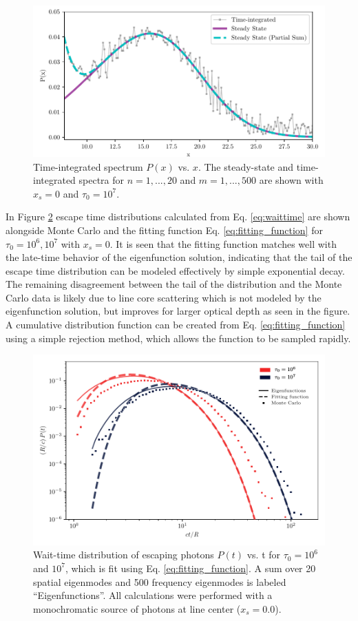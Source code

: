 \documentclass[linenumbers]{aastex63}
\begin{document}
\begin{figure}
    \centering
    \includegraphics{steadystate.pdf}
    \caption{Time-integrated spectrum $P(x)$ vs. $x$. The steady-state and time-integrated spectra for $n=1, ..., 20$ and $m=1, ..., 500$ are shown with $x_s=0$ and $\tau_0=10^7$.}
    \label{fig:steadystate}
\end{figure}


In Figure \ref{fig:escape_time} escape time distributions calculated from Eq. \ref{eq:waittime} are shown alongside Monte Carlo and the fitting function Eq. \ref{eq:fitting_function} for $\tau_0=10^6, 10^7$ with $x_s=0$. It is seen that the fitting function matches well with the late-time behavior of the eigenfunction solution, indicating that the tail of the escape time distribution can be modeled effectively by simple exponential decay. The remaining disagreement between the tail of the distribution and the Monte Carlo data is likely due to line core scattering which is not modeled by the eigenfunction solution, but improves for larger optical depth as seen in the figure. A cumulative distribution function can be created from Eq. \ref{eq:fitting_function} using a simple rejection method, which allows the function to be sampled rapidly.

\begin{figure}
    \centering
    \includegraphics{waittime.pdf}
    \caption{Wait-time distribution of escaping photons $P(t)$ vs. t  for $\tau_0=10^6$ and $10^7$, which is fit using Eq. \ref{eq:fitting_function}. A sum over 20 spatial eigenmodes and 500 frequency eigenmodes is labeled ``Eigenfunctions''. All calculations were performed with a monochromatic source of photons at line center ($x_s = 0.0$).}
    \label{fig:escape_time}
\end{figure}
\end{document}
